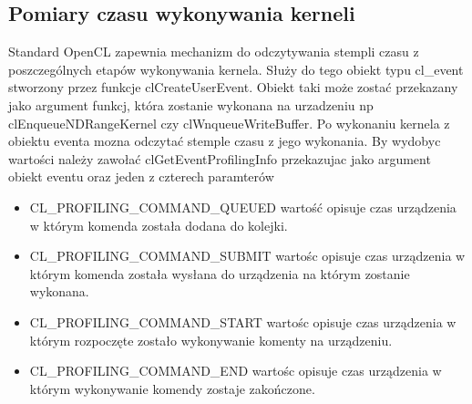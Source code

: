  \subsection{Pomiary czasu wykonywania kerneli}
 Standard OpenCL zapewnia mechanizm do odczytywania stempli czasu z poszczególnych etapów wykonywania kernela. Służy do tego obiekt typu cl\_event stworzony przez funkcje clCreateUserEvent. Obiekt taki może zostać przekazany jako argument funkcj, która zostanie wykonana na urzadzeniu np clEnqueueNDRangeKernel czy clWnqueueWriteBuffer.
 Po wykonaniu kernela z obiektu eventa mozna odczytać stemple czasu z jego wykonania. By wydobyc wartości należy zawołać clGetEventProfilingInfo przekazujac jako argument obiekt eventu oraz jeden z czterech paramterów 
 \begin{itemize}
     \item CL\_PROFILING\_COMMAND\_QUEUED wartość opisuje czas urządzenia w którym komenda została dodana do kolejki.
     \item CL\_PROFILING\_COMMAND\_SUBMIT wartośc opisuje czas urządzenia w którym komenda została wysłana do urządzenia na którym zostanie wykonana.
     \item CL\_PROFILING\_COMMAND\_START wartośc opisuje czas urządzenia w którym rozpoczęte zostało wykonywanie komenty na urządzeniu.
     \item CL\_PROFILING\_COMMAND\_END wartośc opisuje czas urządzenia w którym wykonywanie komendy zostaje zakończone.
\end{itemize}

